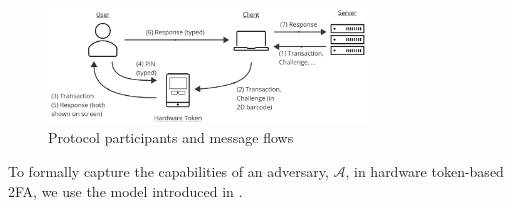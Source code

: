 \begin{figure}
\begin{centering}
\includegraphics[width=8.5cm]{setup}
\end{centering}
\vspace{-7mm}
\caption{\label{fig:setup.}Protocol participants and message flows}
\vspace{-4mm}
\end{figure}
%




To formally capture the capabilities of an adversary, $\mathcal{A}$, in hardware token-based 2FA,  we use the model introduced in \cite{BellarePR00}. 



